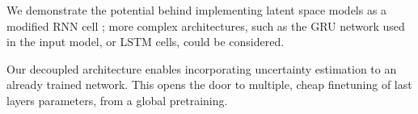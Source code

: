 \documentclass[conference]{IEEEtran}
\begin{document}
We demonstrate the potential behind implementing latent space models as a modified RNN cell ;
more complex architectures, such as the GRU network used in the input model, or LSTM cells, could be considered.

Our decoupled architecture enables incorporating uncertainty estimation to an already trained network.
This opens the door to multiple, cheap finetuning of last layers parameters, from a global pretraining.

\clearpage


\end{document}
